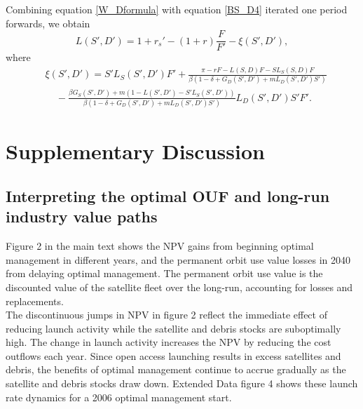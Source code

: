 \documentclass[9pt,twoside,lineno]{pnas-new}
\begin{document}
Combining equation \ref{W_Dformula} with equation \ref{BS_D4} iterated one period forwards, we obtain
\begin{equation*}
L(S',D') = 1 + r_{s}' - (1+r)\frac{F}{F'} - \xi(S',D'),
\end{equation*}
where
\begin{align*}
&\xi(S',D')  = S'L_S(S',D')F' + \frac{\pi - rF - L(S,D)F - S L_S(S,D) F}{\beta (1- \delta + G_D(S',D') + mL_D(S',D')S' )} \\ 
& ~~~~~ -\frac{\beta G_S(S',D') + m(1 - L(S',D') - S'L_S(S',D'))}{\beta (1- \delta + G_D(S',D') + mL_D(S',D')S' )}L_D(S',D')S'F'.
\end{align*}

\section{Supplementary Discussion}

\subsection{Interpreting the optimal OUF and long-run industry value paths}

Figure 2 in the main text shows the NPV gains from beginning optimal management in different years, and the permanent orbit use value losses in 2040 from delaying optimal management. The permanent orbit use value is the discounted value of the satellite fleet over the long-run, accounting for losses and replacements. \\

The discontinuous jumps in NPV in figure 2 reflect the immediate effect of reducing launch activity while the satellite and debris stocks are suboptimally high. The change in launch activity increases the NPV by reducing the cost outflows each year. Since open access launching results in excess satellites and debris, the benefits of optimal management continue to accrue gradually as the satellite and debris stocks draw down. Extended Data figure 4 shows these launch rate dynamics for a 2006 optimal management start. \\
\end{document}
